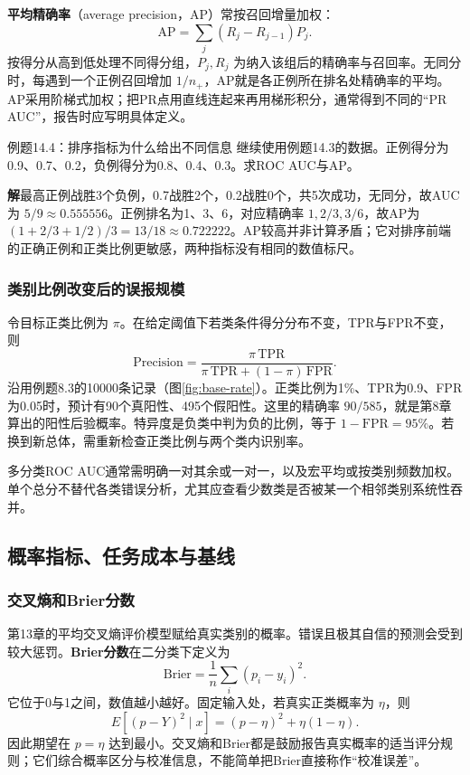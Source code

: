 \documentclass[UTF8,fontset=none,zihao=-4,a4paper]{ctexart}
\newcommand{\term}[1]{\textbf{#1}}
\newcommand{\sol}{\par\noindent\textbf{解}\quad}
\numberwithin{equation}{section}
\numberwithin{figure}{section}
\begin{document}
\term{平均精确率}（average precision，AP）常按召回增量加权：
\[
 \mathrm{AP}=\sum_j(R_j-R_{j-1})P_j.
\]
按得分从高到低处理不同得分组，$P_j,R_j$ 为纳入该组后的精确率与召回率。无同分时，每遇到一个正例召回增加 $1/n_+$，AP就是各正例所在排名处精确率的平均。AP采用阶梯式加权；把PR点用直线连起来再用梯形积分，通常得到不同的“PR AUC”，报告时应写明具体定义。

\begin{infobox}[unbreakable]{例题14.4：排序指标为什么给出不同信息}
继续使用例题14.3的数据。正例得分为0.9、0.7、0.2，负例得分为0.8、0.4、0.3。求ROC AUC与AP。
\sol 最高正例战胜3个负例，0.7战胜2个，0.2战胜0个，共5次成功，无同分，故AUC为 $5/9\approx0.555556$。正例排名为1、3、6，对应精确率 $1,2/3,3/6$，故AP为 $(1+2/3+1/2)/3=13/18\approx0.722222$。AP较高并非计算矛盾；它对排序前端的正确正例和正类比例更敏感，两种指标没有相同的数值标尺。
\end{infobox}

\subsubsection{类别比例改变后的误报规模}
令目标正类比例为 $\pi$。在给定阈值下若类条件得分分布不变，TPR与FPR不变，则
\[
 \mathrm{Precision}=\frac{\pi\,\mathrm{TPR}}
 {\pi\,\mathrm{TPR}+(1-\pi)\,\mathrm{FPR}}.
\]
沿用例题8.3的10000条记录（图\ref{fig:base-rate}）。正类比例为1\%、TPR为0.9、FPR为0.05时，预计有90个真阳性、495个假阳性。这里的精确率 $90/585$，就是第8章算出的阳性后验概率。特异度是负类中判为负的比例，等于 $1-\mathrm{FPR}=95\%$。若换到新总体，需重新检查正类比例与两个类内识别率。

多分类ROC AUC通常需明确一对其余或一对一，以及宏平均或按类别频数加权。单个总分不替代各类错误分析，尤其应查看少数类是否被某一个相邻类别系统性吞并。

\subsection{概率指标、任务成本与基线}
\subsubsection{交叉熵和Brier分数}
第13章的平均交叉熵评价模型赋给真实类别的概率。错误且极其自信的预测会受到较大惩罚。\term{Brier分数}在二分类下定义为
\[
 \mathrm{Brier}=\frac1n\sum_i(p_i-y_i)^2.
\]
它位于0与1之间，数值越小越好。固定输入处，若真实正类概率为 $\eta$，则
\[
 E[(p-Y)^2\mid x]=(p-\eta)^2+\eta(1-\eta).
\]
因此期望在 $p=\eta$ 达到最小。交叉熵和Brier都是鼓励报告真实概率的适当评分规则；它们综合概率区分与校准信息，不能简单把Brier直接称作“校准误差”。
\end{document}
